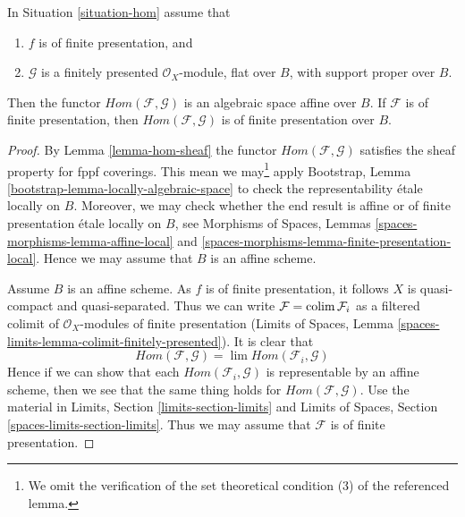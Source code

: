 \begin{proposition}
\label{proposition-hom}
In Situation \ref{situation-hom} assume that
\begin{enumerate}
\item $f$ is of finite presentation, and
\item $\mathcal{G}$ is a finitely presented $\mathcal{O}_X$-module,
flat over $B$, with support proper over $B$.
\end{enumerate}
Then the functor $\mathit{Hom}(\mathcal{F}, \mathcal{G})$ is
an algebraic space affine over $B$. If $\mathcal{F}$
is of finite presentation, then $\mathit{Hom}(\mathcal{F}, \mathcal{G})$
is of finite presentation over $B$.
\end{proposition}

\begin{proof}
By Lemma \ref{lemma-hom-sheaf} the functor
$\mathit{Hom}(\mathcal{F}, \mathcal{G})$ satisfies
the sheaf property for fppf coverings. This mean we may\footnote{We omit
the verification of the set theoretical condition (3) of the referenced
lemma.} apply
Bootstrap, Lemma \ref{bootstrap-lemma-locally-algebraic-space}
to check the representability \'etale locally on $B$. Moreover,
we may check whether the end result is affine or
of finite presentation \'etale locally on $B$, see
Morphisms of Spaces, Lemmas \ref{spaces-morphisms-lemma-affine-local} and
\ref{spaces-morphisms-lemma-finite-presentation-local}.
Hence we may assume that $B$ is an affine scheme.

\medskip\noindent
Assume $B$ is an affine scheme. As $f$ is of finite presentation, it follows
$X$ is quasi-compact and quasi-separated. Thus we can write
$\mathcal{F} = \mathop{\mathrm{colim}}\nolimits \mathcal{F}_i$ as a filtered colimit of
$\mathcal{O}_X$-modules of finite presentation
(Limits of Spaces, Lemma \ref{spaces-limits-lemma-colimit-finitely-presented}).
It is clear that
$$
\mathit{Hom}(\mathcal{F}, \mathcal{G}) =
\lim \mathit{Hom}(\mathcal{F}_i, \mathcal{G})
$$
Hence if we can show that each $\mathit{Hom}(\mathcal{F}_i, \mathcal{G})$
is representable by an affine scheme, then we see that the same thing
holds for $\mathit{Hom}(\mathcal{F}, \mathcal{G})$. Use the material in
Limits, Section \ref{limits-section-limits} and
Limits of Spaces, Section \ref{spaces-limits-section-limits}.
Thus we may assume that $\mathcal{F}$ is of finite presentation.


\end{proof}

